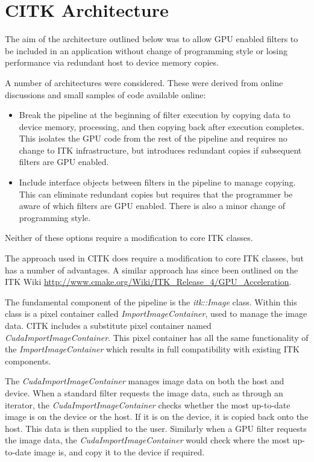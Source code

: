 \documentclass{InsightArticle}
\begin{document}
\section{CITK Architecture}
The aim of the architecture outlined below was to allow GPU enabled
filters to be included in an application without change of programming
style or losing performance via redundant host to device memory copies.

A number of architectures were considered. These were derived from
online discussions and small samples of code available online:
\begin{itemize}
\item Break the pipeline at the beginning of filter execution by
  copying data to device memory, processing, and then copying back
  after execution completes. This isolates the GPU code from the rest
  of the pipeline and requires no change to ITK infrastructure, but
  introduces redundant copies if subsequent filters are GPU enabled.
\item Include interface objects between filters in the pipeline to
  manage copying. This can eliminate redundant copies but requires
  that the programmer be aware of which filters are GPU enabled. There
  is also a minor change of programming style.
\end{itemize}

Neither of these options require a modification to core ITK classes.

The approach used in CITK does require a modification to core ITK
classes, but has a number of advantages. A similar approach has since
been outlined on the ITK Wiki \url{http://www.cmake.org/Wiki/ITK\_Release\_4/GPU\_Acceleration}.

The fundamental component of the pipeline is the {\em itk::Image}
class. Within this class is a pixel container called {\em
  ImportImageContainer}, used to manage the image data. CITK includes
a substitute pixel container named {\em
  CudaImportImageContainer}. This pixel container has all the same
functionality of the {\em ImportImageContainer} which results in full
compatibility with existing ITK components.

The {\em CudaImportImageContainer} manages image data on both the host
and device. When a standard filter requests the image data, such as
through an iterator, the {\em CudaImportImageContainer} checks whether
the most up-to-date image is on the device or the host. If it is on
the device, it is copied back onto the host. This data is then
supplied to the user. Similarly when a GPU filter requests the image
data, the {\em CudaImportImageContainer} would check where the most 
up-to-date image is, and copy it to the device if required.
\end{document}
